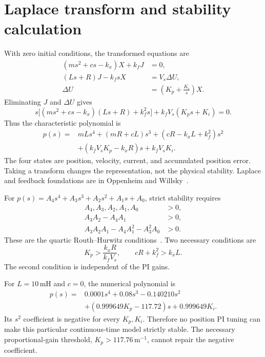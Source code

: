 \documentclass[11pt,letterpaper]{article}
\begin{document}
\section{Laplace transform and stability calculation}
With zero initial conditions, the transformed equations are
\begin{align}
 (ms^2+cs-k_x)X+k_fJ&=0,\\
 (Ls+R)J-k_fsX&=V_s\Delta U,\\
 \Delta U&=\left(K_p+\frac{K_i}{s}\right)X.
\end{align}
Eliminating \(J\) and \(\Delta U\) gives
\begin{equation}
 s\big[(ms^2+cs-k_x)(Ls+R)+k_f^2s\big]
 +k_fV_s(K_ps+K_i)=0.
\end{equation}
Thus the characteristic polynomial is
\begin{equation}
\boxed{\begin{aligned}
 p(s)={}&mLs^4+(mR+cL)s^3+(cR-k_xL+k_f^2)s^2\\
       &+(k_fV_sK_p-k_xR)s+k_fV_sK_i.
\end{aligned}}
\end{equation}
The four states are position, velocity, current, and accumulated position
error. Taking a transform changes the representation, not the physical
stability. Laplace and feedback foundations are in Oppenheim and
Willsky~\cite{oppenheim}.

For \(p(s)=A_4s^4+A_3s^3+A_2s^2+A_1s+A_0\), strict stability requires
\begin{align}
 A_4,A_3,A_2,A_1,A_0&>0,\\
 A_3A_2-A_4A_1&>0,\\
 A_3A_2A_1-A_4A_1^2-A_3^2A_0&>0.
\end{align}
These are the quartic Routh--Hurwitz conditions~\cite{routh}. Two necessary
conditions are
\begin{equation}
 K_p>\frac{k_xR}{k_fV_s},\qquad cR+k_f^2>k_xL.
\end{equation}
The second condition is independent of the PI gains.

For \(L=10\,\mathrm{mH}\) and \(c=0\), the numerical polynomial is
\begin{equation}
\boxed{\begin{aligned}
 p(s)={}&0.0001s^4+0.08s^3-0.140210s^2\\
       &+(0.999649K_p-117.72)s+0.999649K_i.
\end{aligned}}
\end{equation}
Its \(s^2\) coefficient is negative for every \(K_p,K_i\). Therefore no
position PI tuning can make this particular continuous-time model strictly
stable. The necessary proportional-gain threshold,
\(K_p>117.76\,\mathrm{m^{-1}}\), cannot repair the negative coefficient.
\end{document}

